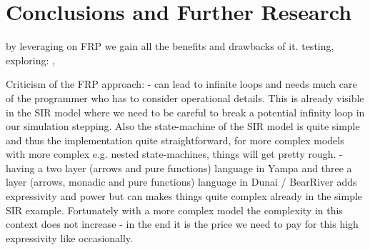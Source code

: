 \section{Conclusions and Further Research}
by leveraging on FRP we gain all the benefits and drawbacks of it.
testing, exploring: \cite{perez_testing_2017}, \cite{perez_back_2017}

Criticism of the FRP approach:
- can lead to infinite loops and needs much care of the programmer who has to consider operational details. This is already visible in the SIR model where we need to be careful to break a potential infinity loop in our simulation stepping. Also the state-machine of the SIR model is quite simple and thus the implementation quite straightforward, for more complex models with more complex e.g. nested state-machines, things will get pretty rough.
- having a two layer (arrows and pure functions) language in Yampa \cite{jeffrey_causality_2013} and three a layer (arrows, monadic and pure functions) language in Dunai / BearRiver adds expressivity and power but can makes things quite complex already in the simple SIR example. Fortunately with a more complex model the complexity in this context does not increase - in the end it is the price we need to pay for this high expressivity like occasionally.

